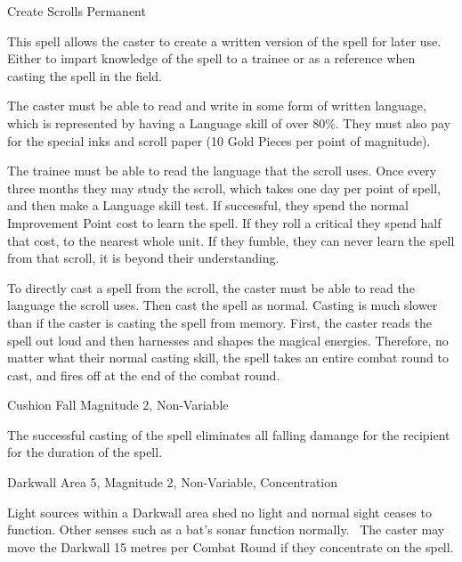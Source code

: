 \begin{rpg-spell}
{Create Scrolls}
{Permanent}

This spell allows the caster to create a written version of the spell for later use. Either to impart knowledge of the spell to a trainee or as a reference when casting the spell in the field.

\begin{rpg-list}
\item The caster must be able to read and write in some form of written language, which is represented by having a Language skill of over 80\%. They must also pay for the special inks and scroll paper (10 Gold Pieces per point of magnitude).
\item The trainee must be able to read the language that the scroll uses. Once every three months they may study the scroll, which takes one day per point of spell, and then make a Language skill test. If successful, they spend the normal Improvement Point cost to learn the spell. If they roll a critical they spend half that cost, to the nearest whole unit. If they fumble, they can never learn the spell from that scroll, it is beyond their understanding.
\item To directly cast a spell from the scroll, the caster must be able to read the language the scroll uses. Then cast the spell as normal. Casting is much slower than if the caster is casting the spell from memory. First, the caster reads the spell out loud and then harnesses and shapes the magical energies. Therefore, no matter what their normal casting skill, the spell takes an entire combat round to cast, and fires off at the end of the combat round.
\end{rpg-list}
\end{rpg-spell}


\begin{rpg-spell}
{Cushion Fall}
{Magnitude 2, Non-Variable}

The successful casting of the spell eliminates all falling damange for the recipient for the duration of the spell.
\end{rpg-spell}


\begin{rpg-spell}
{Darkwall}
{Area 5, Magnitude 2, Non-Variable, Concentration}

Light sources within a Darkwall area shed no light and normal sight ceases to function. Other senses such as a bat’s sonar function normally. 
The caster may move the Darkwall 15 metres per Combat Round if they concentrate on the spell.
\end{rpg-spell}



